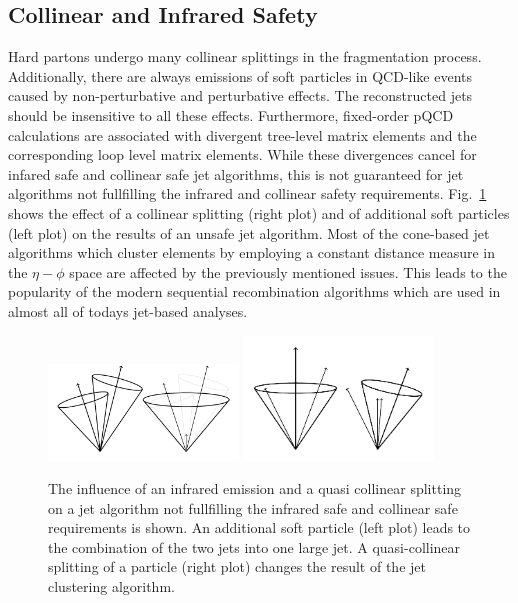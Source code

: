 \subsection{Collinear and Infrared Safety}
\label{sec:coll_safety}

Hard partons undergo many collinear splittings in the fragmentation process.
Additionally, there are always emissions of soft particles in QCD-like events
caused by non-perturbative and perturbative effects. The reconstructed jets
should be insensitive to all these effects. Furthermore, fixed-order pQCD
calculations are associated with divergent tree-level matrix elements and the
corresponding loop level matrix elements. While these divergences cancel for
infared safe and collinear safe jet algorithms, this is not guaranteed for jet
algorithms not fullfilling the infrared and collinear safety requirements.
Fig.~\ref{fig:infrared_safety} shows the effect of a collinear splitting (right
plot) and of additional soft particles (left plot) on the results of an unsafe
jet algorithm. Most of the cone-based jet algorithms which cluster elements
by employing a constant distance measure in the $\eta-\phi$ space are affected by the
previously mentioned issues. This leads to the popularity of the modern sequential
recombination algorithms which are used in almost all of todays jet-based
analyses.

\begin{figure}[htb]
    \centering
    \includegraphics[width=0.45\textwidth]{figures/drawings/infrared_safety/jetinfrared.pdf}\hfill
    \includegraphics[width=0.45\textwidth]{figures/drawings/infrared_safety/jetcollinear.pdf}
    \caption[Effect of infrared emissions and collinear splittings on jet
    algorithms]{The influence of an infrared emission and a quasi
        collinear splitting on a jet algorithm not fullfilling the infrared safe
        and collinear safe requirements is shown. An additional soft particle (left plot)
    leads to the combination of the two jets into one large jet. A
quasi-collinear splitting of a particle (right plot) changes the result of the
jet clustering algorithm.}
    \label{fig:infrared_safety}
\end{figure}

